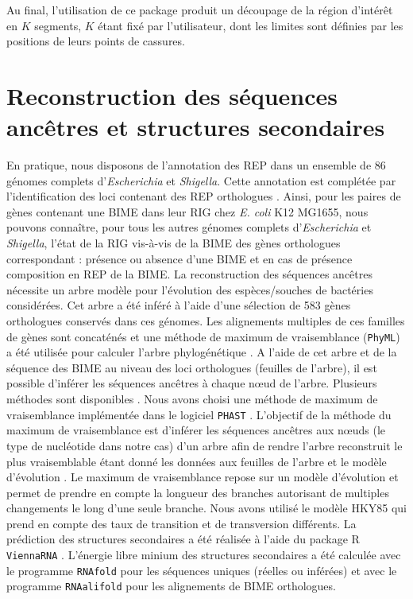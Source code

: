 \documentclass[12pt,a4paper]{report}
\begin{document}
\begin{onehalfspace}
Au final, l'utilisation de ce package produit un découpage de la région d'intérêt en $K$ segments, $K$ étant fixé par l'utilisateur, dont les limites sont définies par les positions de leurs points de cassures.

\section*{Reconstruction des séquences ancêtres et structures secondaires}

En pratique, nous disposons de l’annotation des REP dans un ensemble de 86 génomes complets d’\textit{Escherichia} et \textit{Shigella}. Cette annotation est complétée par l’identification des loci contenant des REP orthologues \citep{Weyder2013}. Ainsi, pour les paires de gènes contenant une BIME dans leur RIG chez \textit{E. coli} K12 MG1655, nous pouvons connaître, pour tous les autres génomes complets  d’\textit{Escherichia} et \textit{Shigella}, l’état de la RIG vis-à-vis de la BIME des gènes orthologues correspondant : présence ou absence d’une BIME et en cas de présence composition en REP de la BIME. 
La reconstruction des séquences ancêtres nécessite un arbre modèle pour l’évolution des espèces/souches de bactéries considérées. Cet arbre a été inféré à l’aide d’une sélection de  583 gènes orthologues conservés dans ces génomes. Les alignements multiples de ces familles de gènes sont concaténés et une méthode de maximum de vraisemblance (\texttt{PhyML}) a été utilisée pour calculer l’arbre phylogénétique \citep{Weyder2013}. A l’aide de cet arbre et de la séquence des BIME au niveau des loci orthologues (feuilles de l’arbre), il est possible d’inférer les séquences ancêtres à chaque nœud de l’arbre. Plusieurs méthodes sont disponibles \citep{Bosc2014}. Nous avons choisi une méthode de maximum de vraisemblance implémentée dans le logiciel \texttt{PHAST} \citep{Hubisz2011}. L'objectif de la méthode du maximum de vraisemblance est d’inférer les séquences ancêtres aux nœuds (le type de nucléotide dans notre cas) d'un arbre afin de rendre l'arbre reconstruit le plus vraisemblable étant donné les données aux feuilles de l'arbre et le modèle d'évolution \citep{Pagel1999}. Le maximum de vraisemblance repose sur un modèle d’évolution et permet de prendre en compte la longueur des branches autorisant de multiples changements le long d'une seule branche. Nous avons utilisé le modèle HKY85 qui prend en compte des taux de transition et de transversion différents. 
La prédiction des structures secondaires a été réalisée à l’aide du package R \texttt{ViennaRNA} \citep{Lorenz2011}. L’énergie libre minium des structures secondaires a été calculée avec le programme \texttt{RNAfold}  pour les séquences uniques (réelles ou inférées) et avec le programme \texttt{RNAalifold} pour les alignements de BIME orthologues. 


\end{onehalfspace}
\end{document}
